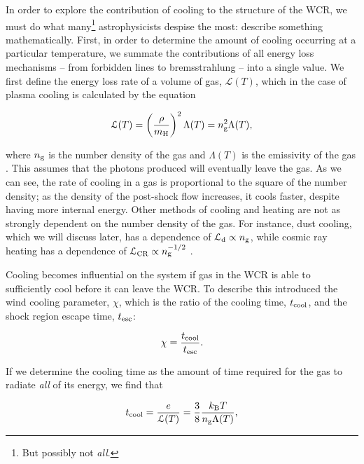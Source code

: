 In order to explore the contribution of cooling to the structure of the WCR, we must do what many\footnote{But possibly not \emph{all}.} astrophysicists despise the most: describe something mathematically.
First, in order to determine the amount of cooling occurring at a particular temperature, we summate the contributions of all energy loss mechanisms -- from forbidden lines to bremsstrahlung -- into a single value.
We first define the energy loss rate of a volume of gas, $\mathcal{L}(T)$, which in the case of plasma cooling is calculated by the equation

\begin{equation}
  \label{eq:energylossrate}
  \mathcal{L}(T) = \left(\frac{\rho}{m_\text{H}}\right)^2 \Lambda(T) = n_\text{g}^2 \Lambda(T) , 
\end{equation}

\noindent
where $n_\text{g}$ is the number density of the gas and $\Lambda(T)$ is the emissivity of the gas \parencite{stevens_colliding_1992}.
This assumes that the photons produced will eventually leave the gas.
As we can see, the rate of cooling in a gas is proportional to the square of the number density; as the density of the post-shock flow increases, it cools faster, despite having more internal energy.
Other methods of cooling and heating are not as strongly dependent on the number density of the gas.
For instance, dust cooling, which we will discuss later, has a dependence of $\mathcal{L}_\text{d} \propto n_\text{g}$, while cosmic ray heating has a dependence of $\mathcal{L}_\text{CR} \propto n_\text{g}^{-1/2}$ \parencite{wienerCosmicRayHeating2013}.

Cooling becomes influential on the system if gas in the WCR is able to sufficiently cool before it can leave the WCR.
To describe this \textcite{stevens_colliding_1992} introduced the wind cooling parameter, $\chi$, which is the ratio of the cooling time, $t_\text{cool}$, and the shock region escape time, $t_\text{esc}$:

\begin{equation}
  \chi = \frac{t_\text{cool}}{t_\text{esc}}.
\end{equation}

\noindent
If we determine the cooling time as the amount of time required for the gas to radiate \emph{all} of its energy, we find that

\begin{equation}
  \label{eq:taucool}
  t_\text{cool} = \frac{e}{\mathcal{L}(T)} = \frac{3}{8} \frac{k_\text{B} T}{n_\text{g} \Lambda(T)},
\end{equation}

